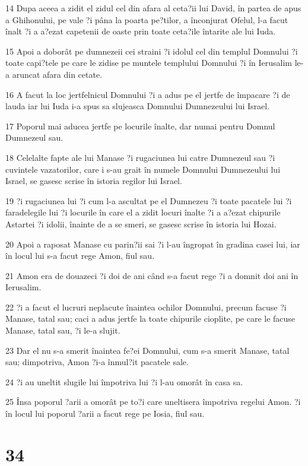 \par 14 Dupa aceea a zidit el zidul cel din afara al ceta?ii lui David, în partea de apus a Ghihonului, pe vale ?i pâna la poarta pe?tilor, a înconjurat Ofelul, l-a facut înalt ?i a a?ezat capetenii de oaste prin toate ceta?ile întarite ale lui Iuda.
\par 15 Apoi a doborât pe dumnezeii cei straini ?i idolul cel din templul Domnului ?i toate capi?tele pe care le zidise pe muntele templului Domnului ?i în Ierusalim le-a aruncat afara din cetate.
\par 16 A facut la loc jertfelnicul Domnului ?i a adus pe el jertfe de împacare ?i de lauda iar lui Iuda i-a spus sa slujeasca Domnului Dumnezeului lui Israel.
\par 17 Poporul mai aducea jertfe pe locurile înalte, dar numai pentru Domnul Dumnezeul sau.
\par 18 Celelalte fapte ale lui Manase ?i rugaciunea lui catre Dumnezeul sau ?i cuvintele vazatorilor, care i s-au grait în numele Domnului Dumnezeului lui Israel, se gasesc scrise în istoria regilor lui Israel.
\par 19 ?i rugaciunea lui ?i cum l-a ascultat pe el Dumnezeu ?i toate pacatele lui ?i faradelegile lui ?i locurile în care el a zidit locuri înalte ?i a a?ezat chipurile Astartei ?i idolii, înainte de a se smeri, se gasesc scrise în istoria lui Hozai.
\par 20 Apoi a raposat Manase cu parin?ii sai ?i l-au îngropat în gradina casei lui, iar în locul lui s-a facut rege Amon, fiul sau.
\par 21 Amon era de douazeci ?i doi de ani când s-a facut rege ?i a domnit doi ani în Ierusalim.
\par 22 ?i a facut el lucruri neplacute înaintea ochilor Domnului, precum facuse ?i Manase, tatal sau; caci a adus jertfe la toate chipurile cioplite, pe care le facuse Manase, tatal sau, ?i le-a slujit.
\par 23 Dar el nu s-a smerit înaintea fe?ei Domnului, cum s-a smerit Manase, tatal sau; dimpotriva, Amon ?i-a înmul?it pacatele sale.
\par 24 ?i au uneltit slugile lui împotriva lui ?i l-au omorât în casa sa.
\par 25 Însa poporul ?arii a omorât pe to?i care uneltisera împotriva regelui Amon. ?i în locul lui poporul ?arii a facut rege pe Iosia, fiul sau.

\chapter{34}

